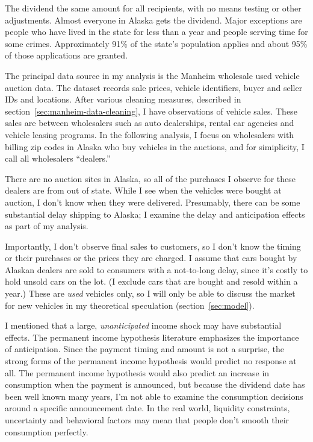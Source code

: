 \documentclass[11pt,letterpaper,oneside]{article}
\newcommand{\snippet}[1]{\hspace{-0.15em}}
\begin{document}
\begin{doublespacing}
The dividend the same amount for all recipients, with no means testing or other adjustments.
Almost everyone in Alaska gets the dividend.
Major exceptions are people who have lived in the state for less than a year and people serving time for some crimes.
Approximately 91\% of the state's population applies and about 95\% of those applications are granted.


The principal data source in my analysis is the Manheim wholesale used vehicle auction data.
The dataset records sale prices, vehicle identifiers, buyer and seller IDs and locations.
After various cleaning measures, described in section~\ref{sec:manheim-data-cleaning}, I have
\snippet{auctions_cleaned_total_obs_count.tex}
observations of vehicle sales.
These sales are between wholesalers such as auto dealerships, rental car agencies and vehicle leasing programs.
In the following analysis, I focus on wholesalers with billing zip codes in Alaska who buy vehicles in the auctions, and for simiplicity, I call all wholesalers ``dealers.''

There are no auction sites in Alaska, so all of the purchases I observe for these dealers are from out of state.
While I see when the vehicles were bought at auction, I don't know when they were delivered.
Presumably, there can be some substantial delay shipping to Alaska; I examine the delay and anticipation effects as part of my analysis.

Importantly, I don't observe final sales to customers, so I don't know the timing or their purchases or the prices they are charged.
I assume that cars bought by Alaskan dealers are sold to consumers with a not-to-long delay, since it's costly to hold unsold cars on the lot.
(I exclude cars that are bought and resold within a year.)
These are \emph{used} vehicles only, so I will only be able to discuss the market for new vehicles in my theoretical speculation (section~\ref{sec:model}).


I mentioned that a large, \emph{unanticipated} income shock may have substantial effects.
The permanent income hypothesis literature emphasizes the importance of anticipation.
Since the payment timing and amount is not a surprise, the strong forms of the permanent income hypothesis would predict no response at all.
The permanent income hypothesis would also predict an increase in consumption when the payment is announced, but because the dividend date has been well known many years, I'm not able to examine the consumption decisions around a specific announcement date.
In the real world, liquidity constraints, uncertainty and behavioral factors may mean that people don't smooth their consumption perfectly.


\end{doublespacing}
\end{document}
